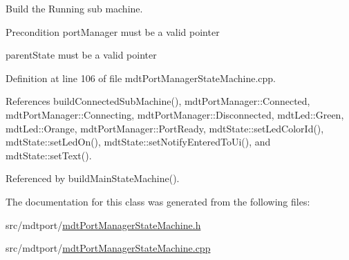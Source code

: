 Build the Running sub machine. 

 \begin{DoxyPrecond}{Precondition}
port\-Manager must be a valid pointer 

parent\-State must be a valid pointer 
\end{DoxyPrecond}


Definition at line 106 of file mdt\-Port\-Manager\-State\-Machine.\-cpp.



References build\-Connected\-Sub\-Machine(), mdt\-Port\-Manager\-::\-Connected, mdt\-Port\-Manager\-::\-Connecting, mdt\-Port\-Manager\-::\-Disconnected, mdt\-Led\-::\-Green, mdt\-Led\-::\-Orange, mdt\-Port\-Manager\-::\-Port\-Ready, mdt\-State\-::set\-Led\-Color\-Id(), mdt\-State\-::set\-Led\-On(), mdt\-State\-::set\-Notify\-Entered\-To\-Ui(), and mdt\-State\-::set\-Text().



Referenced by build\-Main\-State\-Machine().



The documentation for this class was generated from the following files\-:\begin{DoxyCompactItemize}
\item 
src/mdtport/\hyperlink{mdt_port_manager_state_machine_8h}{mdt\-Port\-Manager\-State\-Machine.\-h}\item 
src/mdtport/\hyperlink{mdt_port_manager_state_machine_8cpp}{mdt\-Port\-Manager\-State\-Machine.\-cpp}\end{DoxyCompactItemize}
